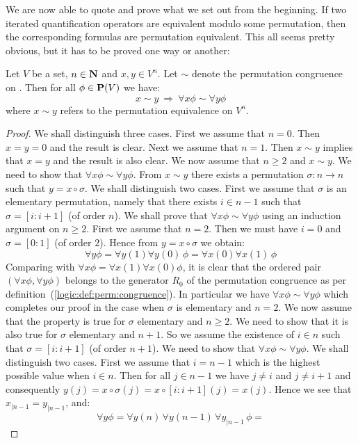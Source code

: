 We are now able to quote and prove what we set out from the
beginning. If two iterated quantification operators are equivalent
modulo some permutation, then the corresponding formulas are
permutation equivalent. This all seems pretty obvious, but it has to
be proved one way or another:
\begin{prop}\label{logic:prop:iterated:permutation}
Let $V$ be a set, $n\in\mbox{$\bf N$}$ and $x,y\in V^{n}$. Let $\sim$ denote the
permutation congruence on \pv. Then for all $\phi\in\mbox{${\bf P}(V)$}$ we have:
    \[
    x\sim y\ \Rightarrow\ \forall x\phi\sim\forall y\phi
    \]
where $x\sim y$ refers to the permutation equivalence on $V^{n}$.
\end{prop}
\begin{proof}
We shall distinguish three cases. First we assume that $n=0$. Then
$x=y=0$ and the result is clear. Next we assume that $n=1$. Then
$x\sim y$ implies that $x=y$ and the result is also clear. We now
assume that $n\geq 2$ and $x\sim y$. We need to show that $\forall
x\phi\sim\forall y\phi$. From $x\sim y$ there exists a permutation
$\sigma:n\to n$ such that $y=x\circ \sigma$. We shall distinguish
two cases. First we assume that $\sigma$ is an elementary
permutation, namely that there exists $i\in n-1$ such that
$\sigma=[i:i+1]$ (of order $n$). We shall prove that $\forall
x\phi\sim\forall y\phi$ using an induction argument on $n\geq 2$.
First we assume that $n=2$. Then we must have $i=0$ and
$\sigma=[0\!:\!1]$ (of order $2$). Hence from $y=x\circ \sigma$ we
obtain:
    \[
    \forall y\phi=\forall y(1)\forall y(0)\,\phi=\forall x(0)\forall x(1)\,\phi
    \]
Comparing with $\forall x\phi=\forall x(1)\forall x(0)\phi$, it is
clear that the ordered pair $(\forall x\phi,\forall y\phi)$ belongs
to the generator $R_{0}$ of the permutation congruence as per
definition~(\ref{logic:def:perm:congruence}). In particular we have
$\forall x\phi\sim\forall y\phi$ which completes our proof in the
case when $\sigma$ is elementary and $n=2$. We now assume that the
property is true for $\sigma$ elementary and $n\geq 2$. We need to
show that it is also true for $\sigma$ elementary and $n+1$. So we
assume the existence of $i\in n$ such that $\sigma=[i:i+1]$ (of
order $n+1$). We need to show that $\forall x\phi\sim\forall y\phi$.
We shall distinguish two cases. First we assume that $i=n-1$ which
is the highest possible value when $i\in n$. Then for all $j\in n-1$
we have $j\neq i$ and $j\neq i+1$ and consequently
$y(j)=x\circ\sigma(j)=x\circ [i:i+1](j)=x(j)$. Hence we see that
$x_{|n-1}=y_{|n-1}$, and:
    \[
    \forall y\phi=\forall y(n)\,\forall y(n-1)\,\forall y_{|n-1}\,\phi =
\]
\end{proof}
